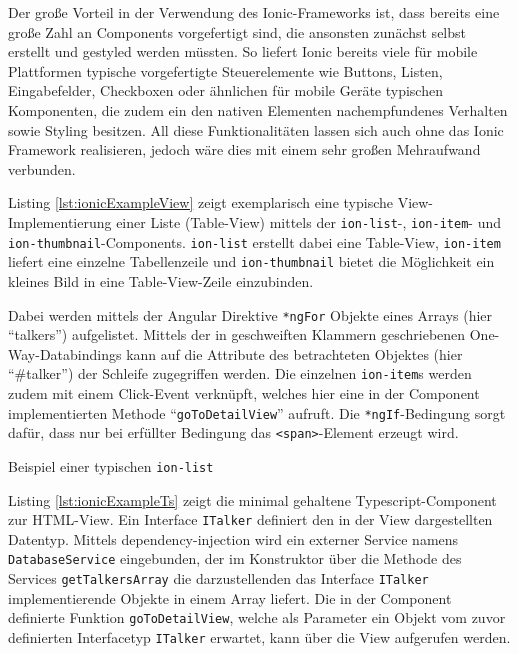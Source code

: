 Der große Vorteil in der Verwendung des Ionic-Frameworks ist, dass bereits eine große Zahl an Components vorgefertigt sind, die ansonsten zunächst selbst erstellt und gestyled werden müssten. So liefert Ionic bereits viele für mobile Plattformen typische vorgefertigte Steuerelemente wie Buttons, Listen, Eingabefelder, Checkboxen oder ähnlichen für mobile Geräte typischen Komponenten, die zudem ein den nativen Elementen nachempfundenes Verhalten sowie Styling besitzen. All diese Funktionalitäten lassen sich auch ohne das Ionic Framework realisieren, jedoch wäre dies mit einem sehr großen Mehraufwand verbunden. 

Listing \ref{lst:ionicExampleView} zeigt exemplarisch eine typische View-Implementierung einer Liste (Table-View) mittels der \texttt{ion-list}-, \texttt{ion-item}- und \texttt{ion-thumbnail}-Components. \texttt{ion-list} erstellt dabei eine Table-View, \texttt{ion-item} liefert eine einzelne Tabellenzeile und \texttt{ion-thumbnail} bietet die Möglichkeit ein kleines Bild in eine Table-View-Zeile einzubinden.

Dabei werden mittels der Angular Direktive \texttt{*ngFor} Objekte eines Arrays (hier \enquote{talkers}) aufgelistet. Mittels der in geschweiften Klammern geschriebenen One-Way-Databindings kann auf die Attribute des betrachteten Objektes (hier \enquote{\#talker}) der Schleife zugegriffen werden. Die einzelnen \texttt{ion-item}s werden zudem mit einem Click-Event verknüpft, welches hier eine in der Component implementierten Methode \enquote{\texttt{goToDetailView}} aufruft. Die \texttt{*ngIf}-Bedingung sorgt dafür, dass nur bei erfüllter Bedingung das \texttt{<span>}-Element erzeugt wird.

\begin{listing}[htb]
    
    \caption{Beispiel einer typischen \texttt{ion-list}}
    \label{lst:ionicExampleView}
\end{listing}

Listing \ref{lst:ionicExampleTs} zeigt die minimal gehaltene Typescript-Component zur HTML-View. Ein Interface \texttt{ITalker} definiert den in der View dargestellten Datentyp. Mittels dependency-injection wird ein externer Service namens \texttt{DatabaseService} eingebunden, der im Konstruktor über die Methode des Services \texttt{getTalkersArray} die darzustellenden das Interface \texttt{ITalker} implementierende Objekte in einem Array liefert. Die in der Component definierte Funktion \texttt{goToDetailView}, welche als Parameter ein Objekt vom zuvor definierten Interfacetyp \texttt{ITalker} erwartet, kann über die View aufgerufen werden.

